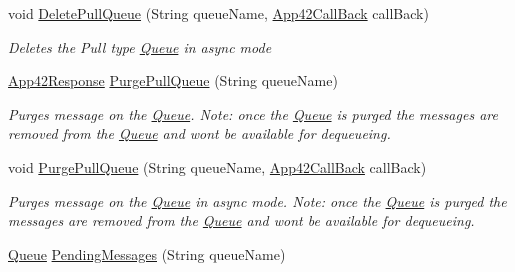 \begin{DoxyCompactItemize}
void \hyperlink{classcom_1_1shephertz_1_1app42_1_1paas_1_1sdk_1_1csharp_1_1message_1_1_queue_service_a5446226a90b60bb596306c89ae879a66}{Delete\+Pull\+Queue} (String queue\+Name, \hyperlink{interfacecom_1_1shephertz_1_1app42_1_1paas_1_1sdk_1_1csharp_1_1_app42_call_back}{App42\+Call\+Back} call\+Back)
\begin{DoxyCompactList}\small\item\em Deletes the Pull type \hyperlink{classcom_1_1shephertz_1_1app42_1_1paas_1_1sdk_1_1csharp_1_1message_1_1_queue}{Queue} in async mode \end{DoxyCompactList}\item 
\hyperlink{classcom_1_1shephertz_1_1app42_1_1paas_1_1sdk_1_1csharp_1_1_app42_response}{App42\+Response} \hyperlink{classcom_1_1shephertz_1_1app42_1_1paas_1_1sdk_1_1csharp_1_1message_1_1_queue_service_ac128082fbee60d6e6b6a478a06577705}{Purge\+Pull\+Queue} (String queue\+Name)
\begin{DoxyCompactList}\small\item\em Purges message on the \hyperlink{classcom_1_1shephertz_1_1app42_1_1paas_1_1sdk_1_1csharp_1_1message_1_1_queue}{Queue}. Note\+: once the \hyperlink{classcom_1_1shephertz_1_1app42_1_1paas_1_1sdk_1_1csharp_1_1message_1_1_queue}{Queue} is purged the messages are removed from the \hyperlink{classcom_1_1shephertz_1_1app42_1_1paas_1_1sdk_1_1csharp_1_1message_1_1_queue}{Queue} and wont be available for dequeueing. \end{DoxyCompactList}\item 
void \hyperlink{classcom_1_1shephertz_1_1app42_1_1paas_1_1sdk_1_1csharp_1_1message_1_1_queue_service_abd7db07a2fcf0b29c965fb367c2f23a2}{Purge\+Pull\+Queue} (String queue\+Name, \hyperlink{interfacecom_1_1shephertz_1_1app42_1_1paas_1_1sdk_1_1csharp_1_1_app42_call_back}{App42\+Call\+Back} call\+Back)
\begin{DoxyCompactList}\small\item\em Purges message on the \hyperlink{classcom_1_1shephertz_1_1app42_1_1paas_1_1sdk_1_1csharp_1_1message_1_1_queue}{Queue} in async mode. Note\+: once the \hyperlink{classcom_1_1shephertz_1_1app42_1_1paas_1_1sdk_1_1csharp_1_1message_1_1_queue}{Queue} is purged the messages are removed from the \hyperlink{classcom_1_1shephertz_1_1app42_1_1paas_1_1sdk_1_1csharp_1_1message_1_1_queue}{Queue} and wont be available for dequeueing. \end{DoxyCompactList}\item 
\hyperlink{classcom_1_1shephertz_1_1app42_1_1paas_1_1sdk_1_1csharp_1_1message_1_1_queue}{Queue} \hyperlink{classcom_1_1shephertz_1_1app42_1_1paas_1_1sdk_1_1csharp_1_1message_1_1_queue_service_abd0dcb5688755dc6aac5e9fe8ee26200}{Pending\+Messages} (String queue\+Name)

\end{DoxyCompactItemize}
